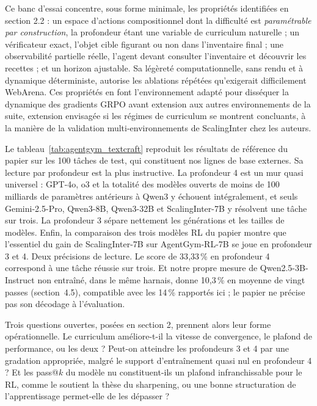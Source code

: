 \documentclass[11pt,a4paper]{article}
\begin{document}
Ce banc d'essai concentre, sous forme minimale, les propriétés identifiées en section 2.2 : un espace d'actions compositionnel dont la difficulté est \emph{paramétrable par construction}, la profondeur étant une variable de curriculum naturelle ; un vérificateur exact, l'objet cible figurant ou non dans l'inventaire final ; une observabilité partielle réelle, l'agent devant consulter l'inventaire et découvrir les recettes ; et un horizon ajustable. Sa légèreté computationnelle, sans rendu et à dynamique déterministe, autorise les ablations répétées qu'exigerait difficilement WebArena. Ces propriétés en font l'environnement adapté pour disséquer la dynamique des gradients GRPO avant extension aux autres environnements de la suite, extension envisagée si les régimes de curriculum se montrent concluants, à la manière de la validation multi-environnements de ScalingInter chez les auteurs.

Le tableau~\ref{tab:agentgym_textcraft} reproduit les résultats de référence du papier sur les 100 tâches de test, qui constituent nos lignes de base externes. Sa lecture par profondeur est la plus instructive. La profondeur 4 est un mur quasi universel : GPT-4o, o3 et la totalité des modèles ouverts de moins de 100 milliards de paramètres antérieurs à Qwen3 y échouent intégralement, et seuls Gemini-2.5-Pro, Qwen3-8B, Qwen3-32B et ScalingInter-7B y résolvent une tâche sur trois. La profondeur 3 sépare nettement les générations et les tailles de modèles. Enfin, la comparaison des trois modèles RL du papier montre que l'essentiel du gain de ScalingInter-7B sur AgentGym-RL-7B se joue en profondeur 3 et 4. Deux précisions de lecture. Le score de 33{,}33\,\% en profondeur 4 correspond à une tâche réussie sur trois. Et notre propre mesure de Qwen2.5-3B-Instruct non entraîné, dans le même harnais, donne 10{,}3\,\% en moyenne de vingt passes (section~4.5), compatible avec les 14\,\% rapportés ici ; le papier ne précise pas son décodage à l'évaluation.


Trois questions ouvertes, posées en section 2, prennent alors leur forme opérationnelle. Le curriculum améliore-t-il la vitesse de convergence, le plafond de performance, ou les deux ? Peut-on atteindre les profondeurs 3 et 4 par une gradation appropriée, malgré le support d'entraînement quasi nul en profondeur 4 ? Et les pass@$k$ du modèle nu constituent-ils un plafond infranchissable pour le RL, comme le soutient la thèse du sharpening, ou une bonne structuration de l'apprentissage permet-elle de les dépasser ?
\end{document}
